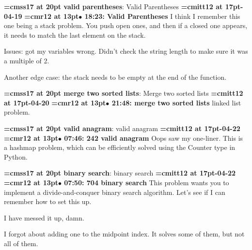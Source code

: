 {\medskip\noindent\bf\font\titlefont=cmss17 at 20pt valid parentheses}: Valid Parentheses
{\medskip\noindent\bf\font\titlefont=cmitt12 at 17pt-04-19}\medskip
{\smallskip\noindent\bf\font\titlefont=cmr12 at 13pt\titlefont $\bullet$ 18:23: Valid Parentheses}\smallskip
I think I remember this one being a stack problem. You push open ones, and then if a closed one appears, it needs to match the last element on the stack.
\par

Issues: got my variables wrong. Didn't check the string length to make sure it was a multiple of 2.
\par

Another edge case: the stack needs to be empty at the end of the function.
\par

{\medskip\noindent\bf\font\titlefont=cmss17 at 20pt merge two sorted lists}: Merge two sorted lists
{\medskip\noindent\bf\font\titlefont=cmitt12 at 17pt-04-20}\medskip
{\smallskip\noindent\bf\font\titlefont=cmr12 at 13pt\titlefont $\bullet$ 21:48: merge two sorted lists}\smallskip
linked list problem.
\par

{\medskip\noindent\bf\font\titlefont=cmss17 at 20pt valid anagram}: valid anagram
{\medskip\noindent\bf\font\titlefont=cmitt12 at 17pt-04-22}\medskip
{\smallskip\noindent\bf\font\titlefont=cmr12 at 13pt\titlefont $\bullet$ 07:46: 242 valid anagram}\smallskip
Oops saw my one-liner. This is a hashmap problem, which can be efficiently solved using the Counter type in Python.
\par

{\medskip\noindent\bf\font\titlefont=cmss17 at 20pt binary search}: binary search
{\medskip\noindent\bf\font\titlefont=cmitt12 at 17pt-04-22}\medskip
{\smallskip\noindent\bf\font\titlefont=cmr12 at 13pt\titlefont $\bullet$ 07:50: 704 binary search}\smallskip
This problem wants you to implement a divide-and-conquer binary search algorithm. Let's see if I can remember how to set this up.
\par

I have messed it up, damn.
\par

I forgot about adding one to the midpoint index. It solves some of them, but not all of them.
\par

